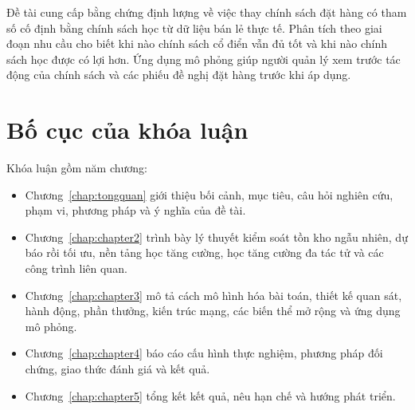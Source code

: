 Đề tài cung cấp bằng chứng định lượng về việc thay chính sách đặt hàng có tham số cố định bằng chính sách học từ dữ liệu bán lẻ thực tế. Phân tích theo giai đoạn nhu cầu cho biết khi nào chính sách cổ điển vẫn đủ tốt và khi nào chính sách học được có lợi hơn. Ứng dụng mô phỏng giúp người quản lý xem trước tác động của chính sách và các phiếu đề nghị đặt hàng trước khi áp dụng.

\section{Bố cục của khóa luận}
\label{sec:bocuc}

Khóa luận gồm năm chương:
\begin{itemize}
    \item Chương~\ref{chap:tongquan} giới thiệu bối cảnh, mục tiêu, câu hỏi nghiên cứu, phạm vi, phương pháp và ý nghĩa của đề tài.
    \item Chương~\ref{chap:chapter2} trình bày lý thuyết kiểm soát tồn kho ngẫu nhiên, dự báo rồi tối ưu, nền tảng học tăng cường, học tăng cường đa tác tử và các công trình liên quan.
    \item Chương~\ref{chap:chapter3} mô tả cách mô hình hóa bài toán, thiết kế quan sát, hành động, phần thưởng, kiến trúc mạng, các biến thể mở rộng và ứng dụng mô phỏng.
    \item Chương~\ref{chap:chapter4} báo cáo cấu hình thực nghiệm, phương pháp đối chứng, giao thức đánh giá và kết quả.
    \item Chương~\ref{chap:chapter5} tổng kết kết quả, nêu hạn chế và hướng phát triển.
\end{itemize}
